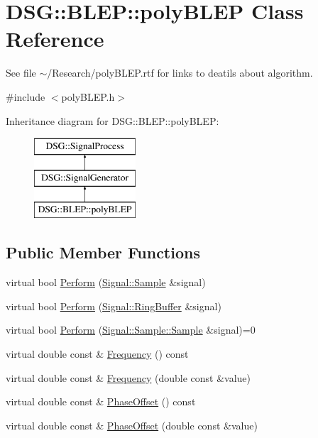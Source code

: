 \hypertarget{classDSG_1_1BLEP_1_1polyBLEP}{\section{D\-S\-G\-:\-:B\-L\-E\-P\-:\-:poly\-B\-L\-E\-P Class Reference}
\label{classDSG_1_1BLEP_1_1polyBLEP}
}


See file $\sim$/\-Research/poly\-B\-L\-E\-P.rtf for links to deatils about algorithm.  




{\ttfamily \#include $<$poly\-B\-L\-E\-P.\-h$>$}

Inheritance diagram for D\-S\-G\-:\-:B\-L\-E\-P\-:\-:poly\-B\-L\-E\-P\-:\begin{figure}[H]
\begin{center}
\leavevmode
\includegraphics[height=3.000000cm]{classDSG_1_1BLEP_1_1polyBLEP}
\end{center}
\end{figure}
\subsection*{Public Member Functions}
\begin{DoxyCompactItemize}
\item 
virtual bool \hyperlink{classDSG_1_1SignalGenerator_a742c5dd499cb94bb27a73b7f76b1f535}{Perform} (\hyperlink{classDSG_1_1Signal_1_1Sample}{Signal\-::\-Sample} \&signal)
\item 
virtual bool \hyperlink{classDSG_1_1SignalGenerator_aabcdcbdf7a2dd73ec883a77f533b6355}{Perform} (\hyperlink{classDSG_1_1Signal_1_1RingBuffer}{Signal\-::\-Ring\-Buffer} \&signal)
\item 
virtual bool \hyperlink{classDSG_1_1SignalProcess_ae8a803d175eca1ec5f34a52035a082b4}{Perform} (\hyperlink{classDSG_1_1Signal_1_1Sample_a21db6fade3ee3554ed3887cb2b74daff}{Signal\-::\-Sample\-::\-Sample} \&signal)=0
\item 
virtual double const \& \hyperlink{classDSG_1_1SignalGenerator_aedac746c5a70818d120858542ecb7c45}{Frequency} () const 
\item 
virtual double const \& \hyperlink{classDSG_1_1SignalGenerator_ae3ce8d45bafabbd86a0f535b15c3cd46}{Frequency} (double const \&value)
\item 
virtual double const \& \hyperlink{classDSG_1_1SignalGenerator_a1ce521847edd0b837fd840998f906b4b}{Phase\-Offset} () const 
\item 
virtual double const \& \hyperlink{classDSG_1_1SignalGenerator_a08b71b1f30ba65e629642c570291dc0e}{Phase\-Offset} (double const \&value)
\end{DoxyCompactItemize}
